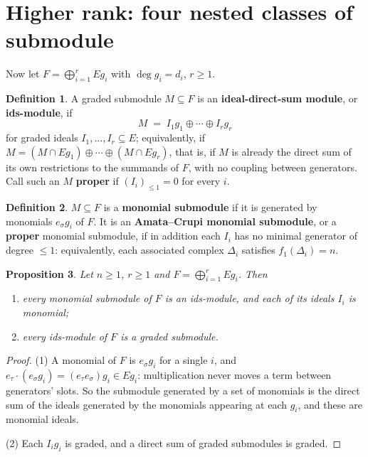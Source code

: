 \documentclass[11pt, a4paper, abstract=yes]{scrartcl}
\theoremstyle{definition}
\newtheorem{definition}{Definition}
\theoremstyle{remark}
\theoremstyle{plain}
\newtheorem{proposition}[definition]{Proposition}
\begin{document}
\section{Higher rank: four nested classes of submodule}
\label{sec-hierarchy}
Now let \(F=\bigoplus_{i=1}^rEg_i\) with \(\deg g_i=d_i\), \(r\ge1\).

\begin{definition}
A graded submodule \(M\subseteq F\) is an \textbf{ideal-direct-sum module}, or \textbf{ids-module}, if
\begin{equation}\label{eq:ids}
  M \;=\; I_1g_1\oplus\cdots\oplus I_rg_r
\end{equation}
for graded ideals \(I_1,\dots,I_r\subseteq E\); equivalently, if
\(M=(M\cap Eg_1)\oplus\cdots\oplus(M\cap Eg_r)\), that is, if \(M\) is already the direct sum of its
own restrictions to the summands of \(F\), with no coupling between generators. Call such an \(M\)
\textbf{proper} if \((I_i)_{\le1}=0\) for every \(i\).
\label{def:ids}
\label{def-ids}
\end{definition}

\begin{definition}
\textcite[Definition 2.1]{AmataCrupi2020} \(M\subseteq F\) is a \textbf{monomial submodule} if it is generated
by monomials \(e_\sigma g_i\) of \(F\). It is an \textbf{Amata--Crupi monomial submodule}, or a \textbf{proper}
monomial submodule, if in addition each \(I_i\) has no minimal generator of degree \(\le1\):
equivalently, each associated complex \(\Delta_i\) satisfies \(f_1(\Delta_i)=n\).
\label{def-monomial-submodule}
\end{definition}

\begin{proposition}
Let \(n\ge1\), \(r\ge1\) and \(F=\bigoplus_{i=1}^rEg_i\). Then
\begin{enumerate}
\item every monomial submodule of \(F\) is an ids-module, and each of its ideals \(I_i\) is monomial;
\item every ids-module of \(F\) is a graded submodule.
\end{enumerate}
\label{prop-hierarchy}
\end{proposition}

\begin{proof}
(1) A monomial of \(F\) is \(e_\sigma g_i\) for a single \(i\), and
\(e_\tau\cdot(e_\sigma g_i)=(e_\tau e_\sigma)g_i\in Eg_i\): multiplication never moves a term between
generators' slots. So the submodule generated by a set of monomials is the direct sum of the ideals
generated by the monomials appearing at each \(g_i\), and these are monomial ideals.

(2) Each \(I_ig_i\) is graded, and a direct sum of graded submodules is graded.
\end{proof}
\end{document}
